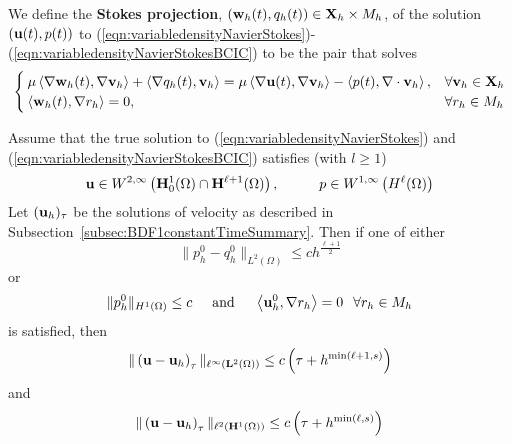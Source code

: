 \documentclass[letterpaper]{erdc}
\begin{document}
We define the \textbf{Stokes projection}, $\left(\textbf{w}_h(t),q_h(t)\right) \in \textbf{X}_h\times M_h$, of the solution $\left(\textbf{u}(t),p(t)\right)$ to (\ref{eqn:variabledensityNavierStokes})-(\ref{eqn:variabledensityNavierStokesBCIC}) to be the pair that solves
\begin{equation}
  \begin{cases}
    \mu\left\langle \nabla\textbf{w}_h(t), \nabla\textbf{v}_h \right\rangle + \left\langle \nabla q_h(t), \textbf{v}_h \right\rangle = \mu\left\langle \nabla \textbf{u}(t), \nabla\textbf{v}_h \right\rangle - \left\langle p(t), \nabla\cdot\textbf{v}_h \right\rangle, & \forall \textbf{v}_h \in \textbf{X}_h\\
    \left\langle \textbf{w}_h(t), \nabla r_h \right\rangle = 0, & \forall r_h\in M_h
  \end{cases}
\end{equation}

\begin{theorem}
  Assume that the true solution to (\ref{eqn:variabledensityNavierStokes}) and (\ref{eqn:variabledensityNavierStokesBCIC}) satisfies (with $l\geq 1$)
  \begin{equation}
    \textbf{u}\in W^{2,\infty}\left(\mathbf{H}_0^1(\Omega)\cap \mathbf{H}^{\ell+1}(\Omega)\right), \hspace{1cm} p\in W^{1,\infty}\left(H^{\ell}(\Omega) \right)
  \end{equation}
  Let $(\textbf{u}_h)_{\tau}$ be the solutions of velocity as described in Subsection~\ref{subsec:BDF1constantTimeSummary}.  Then if one of either
  \begin{equation}
    \|p_h^0 - q_h^0 \|_{L^2(\Omega)} \leq c h^{\frac{\ell+1}{2}}
  \end{equation}
  or
  \begin{equation}
    \|p_h^0\|_{H^1(\Omega)} \leq c \hspace{0.5cm} \mbox{and} \hspace{0.5cm} \left\langle \textbf{u}_h^0, \nabla r_h \right\rangle = 0 \hspace{0.25cm} \forall r_h\in M_h
  \end{equation}
  is satisfied, then
  \begin{equation}
    \|\left(\textbf{u} - \textbf{u}_h\right)_{\tau} \|_{\ell^{\infty}(\mathbf{L}^2(\Omega))} \leq c\left( \tau + h^{\min(\ell+1,s)} \right)
  \end{equation}
  and
  \begin{equation}
    \|\left(\textbf{u} - \textbf{u}_h\right)_{\tau} \|_{\ell^{2}(\mathbf{H}^1(\Omega))} \leq c\left( \tau + h^{\min(\ell,s)} \right)
  \end{equation}
\end{theorem}
\end{document}
